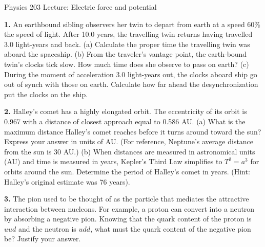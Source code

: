 \documentclass{article}
\begin{document}
\newpage

\begin{center}
\LARGE{Physics 203 Lecture: Electric force and potential} \\[2mm] 
\small{\sf }
\end{center}


\textbf{1.}
% 
%
\quad An earthbound sibling observers her twin to depart from earth at a
speed 60\% the speed of light. After 10.0 years, the travelling twin
returns having travelled 3.0 light-years and back. (a) Calculate the
proper time the travelling twin was aboard the spaceship. (b) From the
traveler's vantage point, the earth-bound twin's clocks tick slow. How
much time does she observe to pass on earth? (c) During the moment of
acceleration 3.0 light-years out, the clocks aboard ship go out of
synch with those on earth. Calculate how far ahead the
desynchronization put the clocks on the ship.
%

\textbf{2.}
% 
%
\quad Halley's comet has a highly elongated orbit. The eccentricity of
its orbit is 0.967 with a distance of closest approach equal to
0.586 AU. (a) What is the maximum distance Halley's comet reaches
before it turns around toward the sun? Express your answer in units
of AU. (For reference, Neptune's average distance from the sun is
30 AU.) (b) When distances are measured in astronomical units (AU)
and time is measured in years, Kepler's Third Law simplifies to
$T^2 = a^3$ for orbits around the sun. Determine the period
of Halley's comet in years. (Hint: Halley's original estimate was
76 years).
%

\textbf{3.}
% 
%
\quad The pion used to be thought of as the particle that mediates the
attractive interaction between nucleons. For example, a proton can
convert into a neutron by absorbing a negative pion. Knowing that the
quark content of the proton is $uud$ and the neutron is
$udd$, what must the quark content of the negative pion be?
Justify your answer.
%
\end{document}
